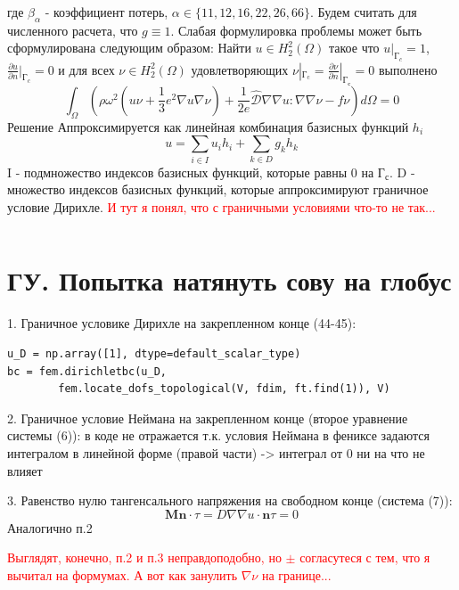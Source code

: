 \documentclass[a4paper,12pt]{article}
\begin{document}
где $\beta_\alpha$ - коэффициент потерь, $\alpha \in  \{11,12,16,22,26,66\}$.
Будем считать для численного расчета, что $ g \equiv 1$.
Слабая формулировка проблемы может быть сформулирована следующим образом: Найти $u \in H^2_2(\Omega)$ такое что $u|_{\text{Г}_c} = 1$, $\frac{\partial u}{\partial n }|_{\text{Г}_c} = 0$ и для всех $\nu \in H^2_2(\Omega)$ удовлетворяющих $\nu|_{\text{Г}_\text{c}}  = \frac{\partial \nu}{\partial n}|_{\text{Г}_\text{с}}= 0$ выполнено
\begin{equation}
\int_\Omega (\rho \omega^2 (u \nu + \frac{1}{3}e^2 \nabla u \nabla \nu) + \frac{1}{2e}\hat{\mathcal{D}} \nabla \nabla u : \nabla \nabla \nu -f\nu)d\Omega = 0    
\end{equation} 
Решение Аппроксимируется как линейная комбинация базисных функций $h_i$
\begin{equation}
    u = \sum_{i \in I}u_ih_i + \sum_{k \in D}g_kh_k
\end{equation}
I - подмножество индексов базисных функций, которые равны 0 на $\text{Г}_\text{с}$. D - множество индексов базисных функций, которые аппроксимируют граничное условие Дирихле. \textcolor{red}{ И тут я понял, что с граничными условиями что-то не так...}

\begin{lstlisting}

\end{lstlisting}

\section{ГУ. Попытка натянуть сову на глобус}
1. Граничное условике Дирихле на закрепленном конце (44-45):
\begin{lstlisting}
u_D = np.array([1], dtype=default_scalar_type)
bc = fem.dirichletbc(u_D, 
        fem.locate_dofs_topological(V, fdim, ft.find(1)), V)
\end{lstlisting}
2. Граничное условие Неймана на закрепленном конце (второе уравнение системы (6)): в коде не отражается т.к. условия Неймана в фениксе задаются интегралом в линейной форме (правой части) -> интеграл от 0 ни на что не влияет

\par
3. Равенство нулю тангенсального напряжения на свободном конце (система (7)):
\begin{equation}
    \textbf{M} \textbf{n} \cdot \tau = D \nabla \nabla u \cdot \textbf{n} \tau  = 0 
\end{equation}
Аналогично п.2
\par
\textcolor{red}{Выглядят, конечно, п.2 и п.3 неправдоподобно, но $\pm$ согласутеся с тем, что я вычитал на формумах. А вот как занулить $\nabla \nu$ на границе... }
\end{document}
